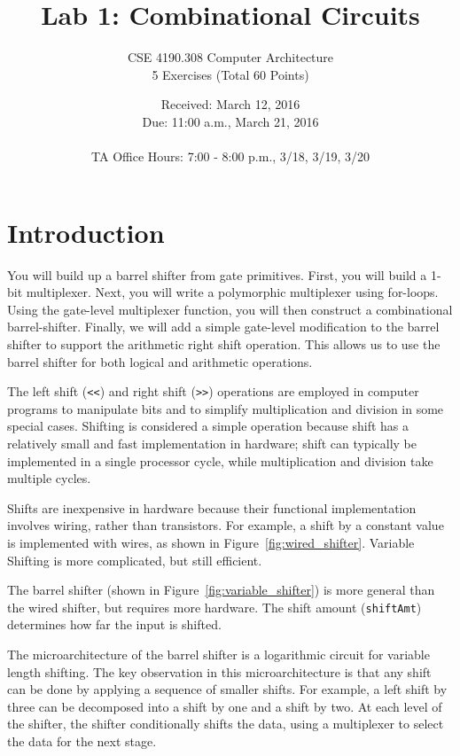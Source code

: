 \documentclass{article}
\begin{document}
\title{Lab 1: Combinational Circuits}   %
\author{CSE 4190.308 Computer Architecture \\ 5 Exercises (Total 60 Points)}
\date{Received: March 12, 2016 \\Due: 11:00 a.m., March 21, 2016\\ \ \\ TA Office Hours: 7:00 - 8:00 p.m., 3/18, 3/19, 3/20}
\maketitle

\section{Introduction}

You will build up a barrel shifter from gate primitives. First, you will build a
1-bit multiplexer. Next, you will write a polymorphic multiplexer
using for-loops. Using the gate-level multiplexer function, you will then
construct a combinational barrel-shifter. Finally, we will add a simple
gate-level modification to the barrel shifter to support the arithmetic right
shift operation. This allows us to use the barrel shifter for both logical and
arithmetic operations.

The left shift (\verb|<<|) and right shift (\verb|>>|) operations are employed in computer
programs to manipulate bits and to simplify multiplication and division in some
special cases. Shifting is considered a simple operation because shift has a
relatively small and fast implementation in hardware; shift can typically be
implemented in a single processor cycle, while multiplication and division take
multiple cycles.

Shifts are inexpensive in hardware because their functional implementation
involves wiring, rather than transistors. For example, a shift by a constant
value is implemented with wires, as shown in Figure~\ref{fig:wired_shifter}. Variable
Shifting is more complicated, but still efficient.

The barrel shifter (shown in Figure~\ref{fig:variable_shifter}) is more general
than the wired shifter, but requires more hardware. The shift amount
(\texttt{shiftAmt}) determines how far the input is shifted.

The microarchitecture of the barrel shifter is a logarithmic circuit for
variable length shifting. The key observation in this microarchitecture is that
any shift can be done by applying a sequence of smaller shifts. For example, a
left shift by three can be decomposed into a shift by one and a shift by two. At
each level of the shifter, the shifter conditionally shifts the data, using a
multiplexer to select the data for the next stage.
\end{document}

